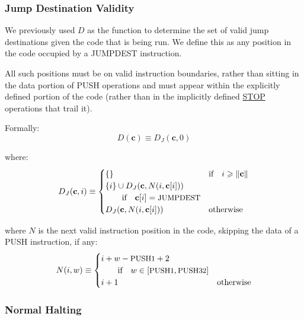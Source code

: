 \documentclass[9pt,oneside]{amsart}
\makeatletter
\newcommand{\linkdest}[1]{\Hy@raisedlink{\hypertarget{#1}{}}}
\makeatother
\begin{document}
\begin{multicols}{2}
\subsubsection{Jump Destination Validity}

We previously used $D$ as the function to determine the set of valid jump destinations given the code that is being run. We define this as any position in the code occupied by a {\small JUMPDEST} instruction.

All such positions must be on valid instruction boundaries, rather than sitting in the data portion of {\small PUSH} operations and must appear within the explicitly defined portion of the code (rather than in the implicitly defined \hyperlink{stop}{{\small STOP}} operations that trail it).

Formally:
\begin{equation}
D(\mathbf{c}) \equiv D_{J}(\mathbf{c}, 0)
\end{equation}

where:
\begin{equation}
D_{J}(\mathbf{c}, i) \equiv \begin{cases}
\{\} & \text{if} \quad i \geqslant \lVert \mathbf{c} \rVert  \\
\{ i \} \cup D_{J}(\mathbf{c}, N(i, \mathbf{c}[i])) & \\
\quad\quad\text{if} \quad \mathbf{c}[i] = \text{\small JUMPDEST} \\
D_{J}(\mathbf{c}, N(i, \mathbf{c}[i])) & \text{otherwise} \\
\end{cases}
\end{equation}

where $N$ is the next valid instruction position in the code, skipping the data of a {\small PUSH} instruction, if any:
\begin{equation}
N(i, w) \equiv \begin{cases}
i + w - \text{\small PUSH1} + 2 & \\
\quad\quad\text{if} \quad w \in [\text{\small PUSH1}, \text{\small PUSH32}] \\
i + 1 & \text{otherwise} \end{cases}
\end{equation}

\subsubsection{Normal Halting}\hypertarget{normal_halting_function_H}{}\linkdest{hhalt}


\end{multicols}
\end{document}

